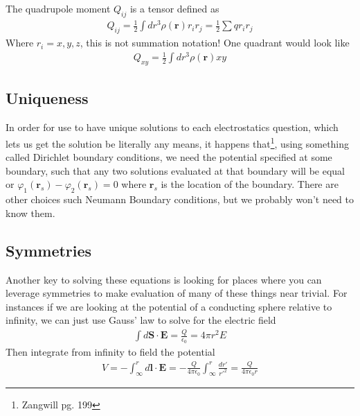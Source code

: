 The quadrupole moment $Q_{ij}$ is a tensor defined as 
\begin{align}
Q_{ij} = \frac{1}{2}\int dr^3 \rho(\textbf{r})r_ir_j = \frac{1}{2} \sum q r_i r_j
\end{align}
Where $r_i = x,y,z$, this is not summation notation! One quadrant would look like
\begin{align}
Q_{xy} = \frac{1}{2}\int dr^3 \rho(\textbf{r})xy
\end{align}





\subsection{Uniqueness}
In order for use to have unique solutions to each electrostatics question, which lets us get the solution be literally any means, it happens that\footnote{Zangwill pg. 199}, using something called Dirichlet boundary conditions, we need the potential specified at some boundary, such that any two solutions evaluated at that boundary will be equal or $\varphi_1(\textbf{r}_s) -\varphi_2(\textbf{r}_s) = 0$ where $\textbf{r}_s$ is the location of the boundary. There are other choices such Neumann Boundary conditions, but we probably won't need to know them.

\subsection{Symmetries}
Another key to solving these equations is looking for places where you can leverage symmetries to make evaluation of many of these things near trivial. For instances if we are looking at the potential of a conducting sphere relative to infinity, we can just use Gauss' law to solve for the electric field
\begin{align}
\int d\textbf{S}\cdot\textbf{E} =\frac{Q}{\epsilon_0} = 4\pi r^2 E
\end{align}
Then integrate from infinity to field the potential
\begin{align}
V = - \int_\infty^r d\textbf{l}\cdot\textbf{E}  = -\frac{Q}{4\pi \epsilon_0}\int_\infty^r \frac{dr'}{r'^2} = \frac{Q}{4\pi\epsilon_0 r}
\end{align}



